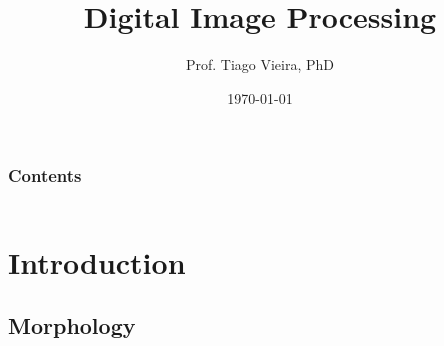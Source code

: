 


\title[Morphology]{Digital Image Processing} %

\author{Prof. Tiago Vieira, PhD} %
\date{\today} %





\begin{frame}
\titlepage %
\end{frame}


\begin{frame}
\frametitle{Contents}
    \setcounter{tocdepth}{1}
    \begin{columns}[t]
        \begin{column}{.5\textwidth}
            \tableofcontents[sections={1-4}]
        \end{column}
        \begin{column}{.5\textwidth}
            \tableofcontents[sections={5-8}]
        \end{column}
    \end{columns}
\end{frame}


\section{Introduction}

\subsection{Morphology}

